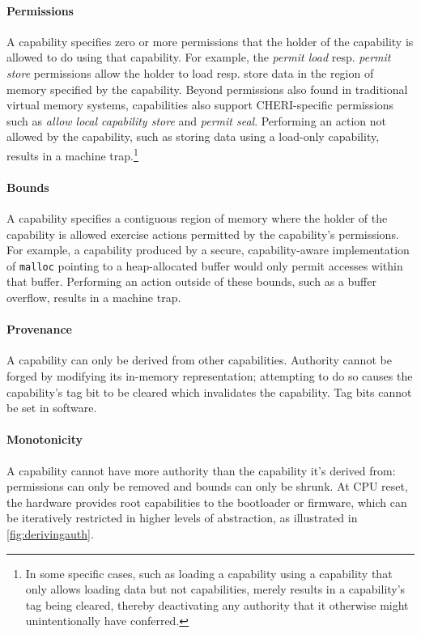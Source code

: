 \documentclass[main.tex]{subfiles}
\begin{document}
\paragraph{Permissions} A capability specifies zero or more permissions that the holder of the capability is allowed to do using that capability. For example, the \emph{permit load} resp. \emph{permit store} permissions allow the holder to load resp. store data in the region of memory specified by the capability. Beyond permissions also found in traditional virtual memory systems, capabilities also support CHERI-specific permissions such as \emph{allow local capability store} and \emph{permit seal}. Performing an action not allowed by the capability, such as storing data using a load-only capability, results in a machine trap.\footnote{In some specific cases, such as loading a capability using a capability that only allows loading data but not capabilities, merely results in a capability's tag being cleared, thereby deactivating any authority that it otherwise might unintentionally have conferred.}

\paragraph{Bounds} A capability specifies a contiguous region of memory where the holder of the capability is allowed exercise actions permitted by the capability's permissions. For example, a capability produced by a secure, capability-aware implementation of \texttt{malloc} pointing to a heap-allocated buffer would only permit accesses within that buffer. Performing an action outside of these bounds, such as a buffer overflow, results in a machine trap.

\paragraph{Provenance} A capability can only be derived from other capabilities. Authority cannot be forged by modifying its in-memory representation; attempting to do so causes the capability's tag bit to be cleared which invalidates the capability. Tag bits cannot be set in software.

\paragraph{Monotonicity} A capability cannot have more authority than the capability it's derived from: permissions can only be removed and bounds can only be shrunk. At CPU reset, the hardware provides root capabilities to the bootloader or firmware, which can be iteratively restricted in higher levels of abstraction, as illustrated in \cref{fig:derivingauth}.
\end{document}
